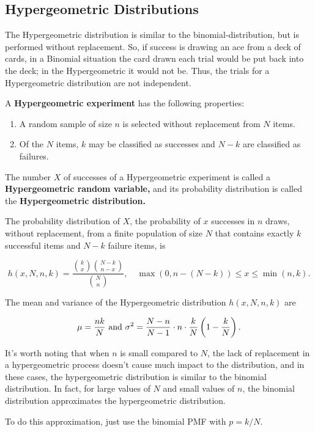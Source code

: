 \documentclass{article}
\begin{document}
\subsection{Hypergeometric Distributions}

\begin{definition}
The Hypergeometric distribution is similar to the \@{binomial-distribution}, but is performed without replacement. So, if success is drawing an ace from a deck of cards, in a Binomial situation the card drawn each trial would be put back into the deck; in the Hypergeometric it would not be. Thus, the trials for a Hypergeometric distribution are not \@{independent}.

A \textbf{Hypergeometric experiment} has the following properties:

\begin{enumerate}
\item A random sample of size $n$ is selected without replacement from $N$ items.
\item Of the $N$ items, $k$ may be classified as successes and $N - k$ are classified as failures.
\end{enumerate}

The number $X$ of successes of a Hypergeometric experiment is called a \textbf{Hypergeometric random variable,} and its \@{probability distribution} is called the \textbf{Hypergeometric distribution.}

The probability distribution of $X$, the \@{probability} of $x$ successes in $n$ draws, without replacement, from a finite population of size $N$ that contains exactly $k$ successful items and $N - k$ failure items, is

\[ h(x, N, n, k) = \frac{\binom{k}{x}\binom{N-k}{n-x}}{\binom{N}{n}}, \quad \max{(0, n - (N -k))} \leq x \leq \min{(n, k)}. \]

The mean and \@{variance} of the Hypergeometric distribution $h(x, N, n, k)$ are

\[ \mu = \frac{nk}{N} ~ \text{and} ~ \sigma^2 = \frac{N - n}{N - 1} \cdot n \cdot \frac{k}{N} \left(1 - \frac{k}{N}\right). \]

It's worth noting that when $n$ is small compared to $N$, the lack of replacement in a hypergeometric process doesn't cause much impact to the distribution, and in these cases, the hypergeometric distribution is similar to the binomial distribution. In fact, for large values of $N$ and small values of $n$, the binomial distribution approximates the hypergeometric distribution.

To do this approximation, just use the binomial PMF with $p = k/N.$
\end{definition}
\end{document}
